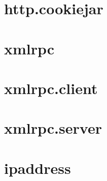 \section{http.cookiejar}






\section{xmlrpc}







\section{xmlrpc.client}






\section{xmlrpc.server}






\section{ipaddress}


